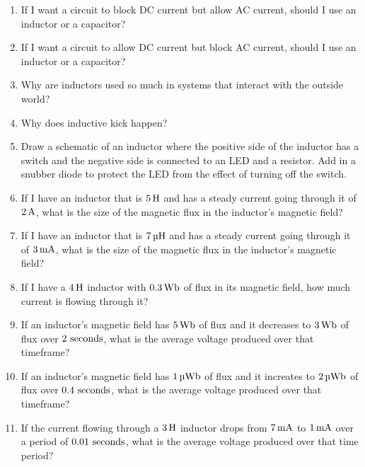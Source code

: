 \begin{enumerate}
\item If I want a circuit to block DC current but allow AC current, should I use an inductor or a capacitor?
\item If I want a circuit to allow DC current but block AC current, should I use an inductor or a capacitor?
\item Why are inductors used so much in systems that interact with the outside world?
\item Why does inductive kick happen?
\item Draw a schematic of an inductor where the positive side of the inductor has a switch and the negative side is connected to an LED and a resistor.  Add in a snubber diode to protect the LED from the effect of turning off the switch.
\item If I have an inductor that is $5\myhy$ and has a steady current going through it of $2\,\si{\ampere}$, what is the size of the magnetic flux in the inductor's magnetic field?
\item If I have an inductor that is $7\myuhy$ and has a steady current going through it of $3\,\si{\milli\ampere}$, what is the size of the magnetic flux in the inductor's magnetic field?
\item If I have a $4\myhy$ inductor with $0.3\mywb$ of flux in its magnetic field, how much current is flowing through it?
\item If an inductor's magnetic field has $5\mywb$ of flux and it decreases to $3\mywb$ of flux over $2\textrm{ seconds}$, what is the average voltage produced over that timeframe?
\item If an inductor's magnetic field has $1\myuwb$ of flux and it increates to $2\myuwb$ of flux over $0.4\textrm{ seconds}$, what is the average voltage produced over that timeframe?
\item If the current flowing through a $3\myhy$ inductor drops from $7\,\si{\milli\ampere}$ to $1\,\si{\milli\ampere}$ over a period of $0.01\textrm{ seconds}$, what is the average voltage produced over that time period?
\end{enumerate}
